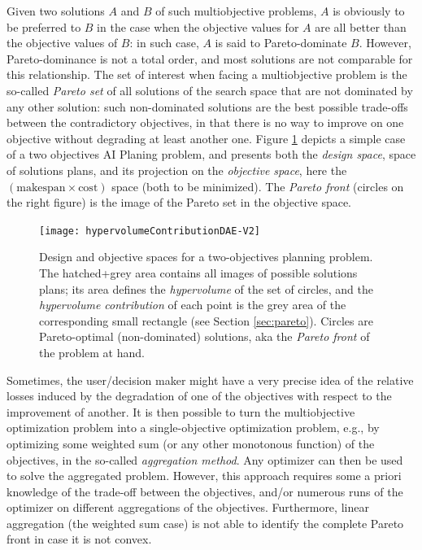 \documentclass{article}
\begin{document}
Given two solutions $A$ and $B$ of such multiobjective problems, $A$ is obviously to be preferred to $B$ in the case when the objective values for $A$ are all better than the objective values of $B$: in such case, $A$ is said to Pareto-dominate $B$. However, Pareto-dominance is not a total order, and most solutions are not comparable for this relationship. The set of interest when facing a multiobjective problem is the so-called {\em Pareto set} of all solutions of the search space that are not dominated by any other solution: such non-dominated solutions are the best possible trade-offs between the contradictory objectives, in that there is no way to improve on one objective without degrading at least another one. Figure \ref{fig:hypervolume} depicts a simple case of a two objectives AI Planing problem, and presents both the {\em design space}, space of solutions plans, and its projection on the {\em objective space}, here the $(\mbox{makespan} \times \mbox{cost})$ space (both to be minimized). The {\em Pareto front} (circles on the right figure) is the image of the Pareto set in the objective space.


\begin{figure}[h!]
\centerline{ \texttt{[image: hypervolumeContributionDAE-V2]}}
\caption{Design and objective spaces for a two-objectives planning problem. The hatched+grey area contains all images of possible solutions plans; its area defines the {\em hypervolume} of the set of circles, and the {\em hypervolume contribution} of each point is the grey area of the corresponding small rectangle (see Section \ref{sec:pareto}). Circles are Pareto-optimal (non-dominated) solutions, aka the {\em Pareto front} of the problem at hand.}
\label{fig:hypervolume}
\end{figure}


Sometimes, the user/decision maker might have a very precise idea of the relative losses induced by the degradation of one of the objectives with respect to the improvement of another. It is then possible to turn the multiobjective optimization problem into a single-objective optimization problem, e.g., by optimizing some weighted sum (or any other monotonous function) of the objectives, in the so-called {\em aggregation method}. Any optimizer can then be used to solve the aggregated problem. However, this approach requires some a priori knowledge of the trade-off between the objectives, and/or numerous runs of the optimizer on different aggregations of the objectives. Furthermore, linear aggregation (the weighted sum case) is not able to identify the complete Pareto front in case it is not convex. 
\end{document}
